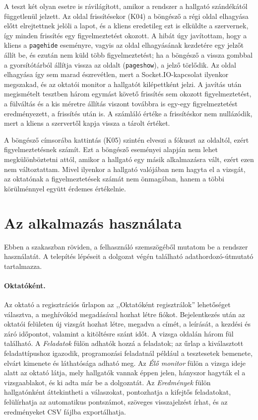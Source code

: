 A teszt két olyan esetre is rávilágított, amikor a rendszer a hallgató szándékától függetlenül
jelzett. Az oldal frissítésekor (K04) a böngésző a régi oldal elhagyása előtt elrejtettnek jelöli a
lapot, és a kliens eredetileg ezt is elküldte a szervernek, így minden frissítés egy
figyelmeztetést okozott. A hibát úgy javítottam, hogy a kliens a \texttt{pagehide} eseményre,
vagyis az oldal elhagyásának kezdetére egy jelzőt állít be, és ezután nem küld több figyelmeztetést;
ha a böngésző a vissza gombbal a gyorsítótárból állítja vissza az oldalt (\texttt{pageshow}), a
jelző törlődik. Az oldal elhagyása így sem marad észrevétlen, mert a Socket.IO-kapcsolat ilyenkor
megszakad, és az oktatói monitor a hallgatót kilépettként jelzi. A javítás után megismételt
tesztben három egymást követő frissítés sem okozott figyelmeztetést, a fülváltás és a kis méretre
állítás viszont továbbra is egy-egy figyelmeztetést eredményezett, a frissítés után is. A
számláló értéke a frissítéskor nem nullázódik, mert a kliens a szervertől kapja vissza a tárolt
értéket.

A böngésző címsorába kattintás (K05) szintén elveszi a fókuszt az oldaltól, ezért figyelmeztetésnek
számít. Ezt a böngésző eseményei alapján nem lehet megkülönböztetni attól, amikor a hallgató egy
másik alkalmazásra vált, ezért ezen nem változtattam. Mivel ilyenkor a hallgató valójában nem
hagyta el a vizsgát, az oktatónak a figyelmeztetések számát nem önmagában, hanem a többi
körülménnyel együtt érdemes értékelnie.

\section{Az alkalmazás használata}
\label{sec:hasznalat}

Ebben a szakaszban röviden, a felhasználó szemszögéből mutatom be a rendszer használatát. A
telepítés lépéseit a dolgozat végén található adathordozó-útmutató tartalmazza.

\paragraph{Oktatóként.} Az oktató a regisztrációs űrlapon az ,,Oktatóként regisztrálok''
lehetőséget választva, a meghívókód megadásával hozhat létre fiókot. Bejelentkezés után az oktatói
felületen új vizsgát hozhat létre, megadva a címét, a leírását, a kezdési és záró időpontot,
valamint a kitöltésre szánt időt. A vizsga oldalán három fül található. A \textit{Feladatok} fülön
adhatók hozzá a feladatok; az űrlap a kiválasztott feladattípushoz igazodik, programozási
feladatnál például a tesztesetek bemenete, elvárt kimenete és láthatósága adható meg. Az
\textit{Élő monitor} fülön a vizsga ideje alatt az oktató látja, mely hallgatók vannak éppen
jelen, hányszor hagyták el a vizsgaablakot, és ki adta már be a dolgozatát. Az
\textit{Eredmények} fülön hallgatónként áttekintheti a válaszokat, pontozhatja a kifejtős
feladatokat, felülírhatja az automatikus pontszámot, szöveges visszajelzést írhat, és az
eredményeket CSV fájlba exportálhatja.

